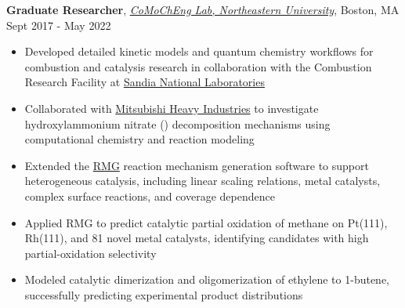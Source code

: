 \documentclass[10pt, line]{res}
\begin{document}
\begin{resume}
\textbf{Graduate Researcher}, \href{http://www.northeastern.edu/comocheng/people/}{\sl CoMoChEng Lab, Northeastern University}, Boston, MA \hspace{0.2in}  \hfill Sept 2017 - May 2022
\begin{itemize}
    \item Developed detailed kinetic models and quantum chemistry workflows for combustion and catalysis research in collaboration with the Combustion Research Facility at \href{https://www.sandia.gov/}{Sandia National Laboratories}
    \item Collaborated with \href{https://www.mhi.com/}{Mitsubishi Heavy Industries} to investigate hydroxylammonium nitrate () decomposition mechanisms using computational chemistry and reaction modeling
    \item Extended the \href{https://rmg.mit.edu/}{RMG} reaction mechanism generation software to support heterogeneous catalysis, including linear scaling relations, metal catalysts, complex surface reactions, and coverage dependence
    \item Applied RMG to predict catalytic partial oxidation of methane on Pt(111), Rh(111), and 81 novel metal catalysts, identifying candidates with high partial-oxidation selectivity
    \item Modeled catalytic dimerization and oligomerization of ethylene to 1-butene, successfully predicting experimental product distributions
\end{itemize}
\vspace{-10pt}



\end{resume}
\end{document}
